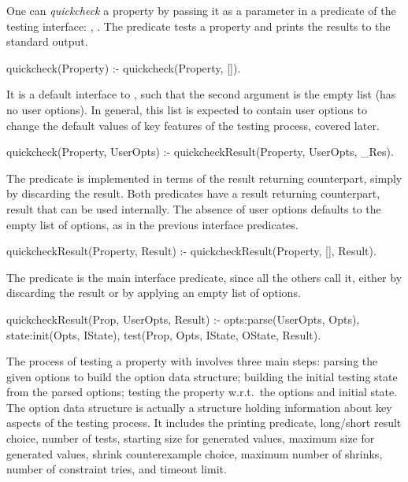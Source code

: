 One can \emph{quickcheck} a property by passing it as a parameter in a
predicate of the \plqc{} testing interface: ,
 .
%
The  predicate tests a property and prints the results
to the standard output.
%
\begin{yapcode}
 quickcheck(Property) :-
   quickcheck(Property, []).
\end{yapcode}
%
It is a default interface to , such that the second argument
is the empty list (has no user options).
%
In general, this list is expected to contain user options to change the default
values of key features of the testing process, covered later.
\begin{yapcode}
 quickcheck(Property, UserOpts)  :-
   quickcheckResult(Property, UserOpts, _Res).
\end{yapcode}
%
The predicate is implemented in terms of the result returning
counterpart, simply by discarding the result.
%
Both  predicates have a result returning counterpart,
result that can be used internally.
%
The absence of user options defaults to the empty list of options, as in
the previous interface predicates.
\begin{yapcode}
 quickcheckResult(Property, Result) :-
   quickcheckResult(Property, [], Result).
\end{yapcode}
The predicate  is the main interface predicate,
since all the others call it, either by discarding the result or by applying
an empty list of options.
\begin{yapcode}
 quickcheckResult(Prop, UserOpts, Result) :-
   opts:parse(UserOpts, Opts),
   state:init(Opts, IState),
   test(Prop, Opts, IState, OState, Result).
\end{yapcode}


The process of testing a property with 
involves three main steps: parsing the given options to build the option data
structure; building the initial testing state from the parsed options; testing the
property w.r.t.\ the  options and initial state.
%
The option data structure is actually a structure holding information
about key aspects of the testing process.
%
It includes the printing predicate, long/short result choice, number of
tests, starting size for generated values, maximum size for generated
values, shrink counterexample choice, maximum number of shrinks, number
of constraint tries, and timeout limit.

